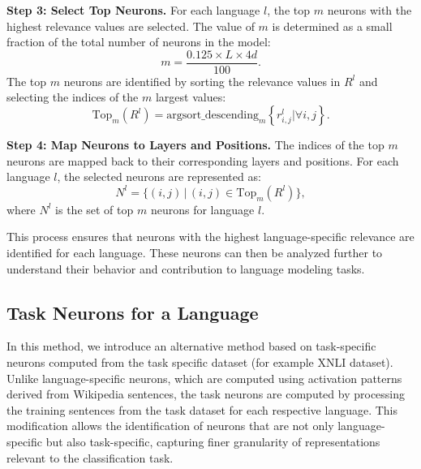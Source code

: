 \textbf{Step 3: Select Top Neurons.} 
For each language \(l\), the top \(m\) neurons with the highest relevance values are selected. The value of \(m\) is determined as a small fraction of the total number of neurons in the model:
\begin{equation}
	m = \frac{0.125 \times L \times 4d}{100}.
\end{equation}
The top \(m\) neurons are identified by sorting the relevance values in \(R^l\) and selecting the indices of the \(m\) largest values:
\begin{equation}
	\text{Top}_m(R^l) = \text{argsort\_descending}_m \left\{r_{i,j}^l | \forall i, j\right\}.
\end{equation}

\textbf{Step 4: Map Neurons to Layers and Positions.} 
The indices of the top \(m\) neurons are mapped back to their corresponding layers and positions. For each language \(l\), the selected neurons are represented as:
\begin{equation}
	N^l = \{(i, j) \, | \, (i, j) \in \text{Top}_m(R^l)\},
\end{equation}
where \(N^l\) is the set of top \(m\) neurons for language \(l\).

This process ensures that neurons with the highest language-specific relevance are identified for each language. These neurons can then be analyzed further to understand their behavior and contribution to language modeling tasks.

\subsection{Task Neurons for a Language}

In this method, we introduce an alternative method based on task-specific neurons computed from the task specific dataset (for example XNLI dataset). Unlike language-specific neurons, which are computed using activation patterns derived from Wikipedia sentences, the task neurons are computed by processing the training sentences from the task dataset for each respective language. This modification allows the identification of neurons that are not only language-specific but also task-specific, capturing finer granularity of representations relevant to the classification task.

